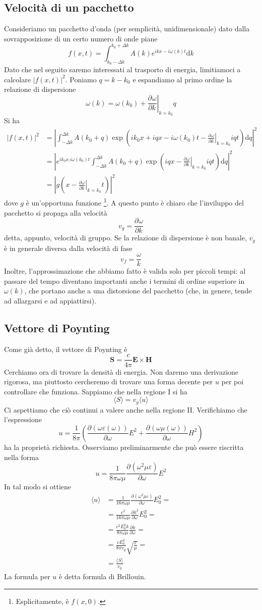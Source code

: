 \documentclass[a4paper,11pt]{book}
\renewcommand{\d}{\mathrm{d}}
\newcommand{\der}[3][]{\frac{\partial ^{#1}#2}{\partial {#3}^{#1}}}
\renewcommand{\vec}[1]{\mathbf{#1}}
\theoremstyle{theorem}
\theoremstyle{definition}
\begin{document}
\subsection{Velocità di un pacchetto}
Consideriamo un pacchetto d'onda (per semplicità, unidimensionale) dato dalla sovrapposizione di un certo numero di onde piane
\[f(x,t)=\int_{k_0-\Delta k}^{k_0+\Delta k}A(k)e^{ikx-i\omega(k)t}\d k\]
Dato che nel seguito saremo interessati al trasporto di energia, limitiamoci a calcolare $|f(x,t)|^2$. Poniamo $q=k-k_0$ e espandiamo al primo ordine la relazione di dispersione
\[\omega(k)=\omega(k_0)+\left.\der{\omega}{k}\right|_{k=k_0}q\]
Si ha
\begin{align*}
	|f(x,t)|^2&=\left|\int_{-\Delta k}^{\Delta k}A(k_0+q)\exp\left(ik_0x+iqx-i\omega(k_0)t-\left.\der{\omega}{k}\right|_{k=k_0}iqt\right)\d q\right|^2\\&=\left|e^{ik_0x.i\omega(k_0)t}\int_{-\Delta k}^{\Delta k}A(k_0+q)\exp\left(iqx-\left.\der{\omega}{k}\right|_{k=k_0}iqt\right)\d q\right|^2\\&=\left|g\left(x-\left.\der{\omega}{k}\right|_{k=k_0}t\right)\right|^2
\end{align*}
dove $g$ è un'opportuna funzione \footnote{Esplicitamente, è $f(x,0)$.}. A questo punto è chiaro che l'inviluppo del pacchetto si propaga alla velocità
\[v_g=\der{\omega}{k}\]
detta, appunto, velocità di gruppo. Se la relazione di dispersione è non banale, $v_g$ è in generale diversa dalla velocità di fase
\[v_f=\frac{\omega}{k}\]
Inoltre, l'approssimazione che abbiamo fatto è valida solo per piccoli tempi: al passare del tempo diventano importanti anche i termini di ordine superiore in $\omega(k)$, che portano anche a una distorsione del pacchetto (che, in genere, tende ad allargarsi e ad appiattirsi).
\subsection{Vettore di Poynting}
Come già detto, il vettore di Poynting è
\[\vec{S}=\frac{c}{4\pi}\vec{E}\times\vec{H}\]
Cerchiamo ora di trovare la densità di energia. Non daremo una derivazione rigorosa, ma piuttosto cercheremo di trovare una forma decente per $u$ per poi controllare che funziona. Sappiamo che nella regione I si ha
\[\langle S\rangle=v_g\langle u\rangle \]
Ci aspettiamo che ciò continui a valere anche nella regione II. Verifichiamo che l'espressione
\[u=\frac{1}{8\pi}\left(\der{(\omega\varepsilon(\omega))}{\omega}E^2+\der{(\omega\mu(\omega))}{\omega}H^2\right)\]
ha la proprietà richiesta. Osserviamo preliminarmente che può essere riscritta nella forma
\[u=\frac{1}{8\pi\omega\mu}\der{(\omega^2\mu\varepsilon)}{\omega}E^2\]
In tal modo si ottiene
\begin{align*}
	\langle u\rangle&=\frac{1}{16\pi\omega\mu}\der{(\omega^2\mu\varepsilon)}{\omega}E_0^2=\\&=\frac{c^2}{16\pi\omega\mu}\der{k^2}{\omega}E_0^2=\\&=\frac{c^2E_0^2k}{8\pi\omega\mu}\der{k}{\omega}=\\&=\frac{cE_0^2}{8\pi v_g}\sqrt{\frac{\varepsilon}{\mu}}=\\&=\frac{\langle S\rangle}{v_g}
\end{align*}
La formula per $u$ è detta formula di Brillouin.
\newpage
\end{document}
